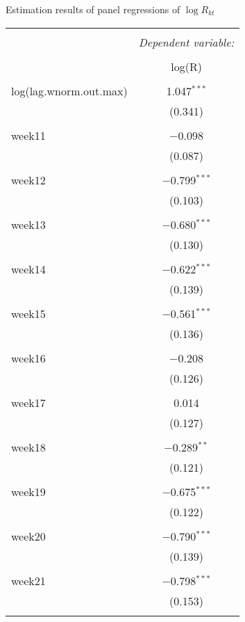   \caption{Estimation results of panel regressions of $\log R_{kt}$} 
  \label{} 
\small 
\begin{tabular}{@{\extracolsep{5pt}}lc} 
\\[-1.8ex]\hline 
\hline \\[-1.8ex] 
 & \multicolumn{1}{c}{\textit{Dependent variable:}} \\ 
\cline{2-2} 
\\[-1.8ex] & log(R) \\ 
\hline \\[-1.8ex] 
 log(lag.wnorm.out.max) & 1.047$^{***}$ \\ 
  & (0.341) \\ 
  & \\ 
 week11 & $-$0.098 \\ 
  & (0.087) \\ 
  & \\ 
 week12 & $-$0.799$^{***}$ \\ 
  & (0.103) \\ 
  & \\ 
 week13 & $-$0.680$^{***}$ \\ 
  & (0.130) \\ 
  & \\ 
 week14 & $-$0.622$^{***}$ \\ 
  & (0.139) \\ 
  & \\ 
 week15 & $-$0.561$^{***}$ \\ 
  & (0.136) \\ 
  & \\ 
 week16 & $-$0.208 \\ 
  & (0.126) \\ 
  & \\ 
 week17 & 0.014 \\ 
  & (0.127) \\ 
  & \\ 
 week18 & $-$0.289$^{**}$ \\ 
  & (0.121) \\ 
  & \\ 
 week19 & $-$0.675$^{***}$ \\ 
  & (0.122) \\ 
  & \\ 
 week20 & $-$0.790$^{***}$ \\ 
  & (0.139) \\ 
  & \\ 
 week21 & $-$0.798$^{***}$ \\ 
  & (0.153) \\ 
  & \\ 

\end{tabular}
